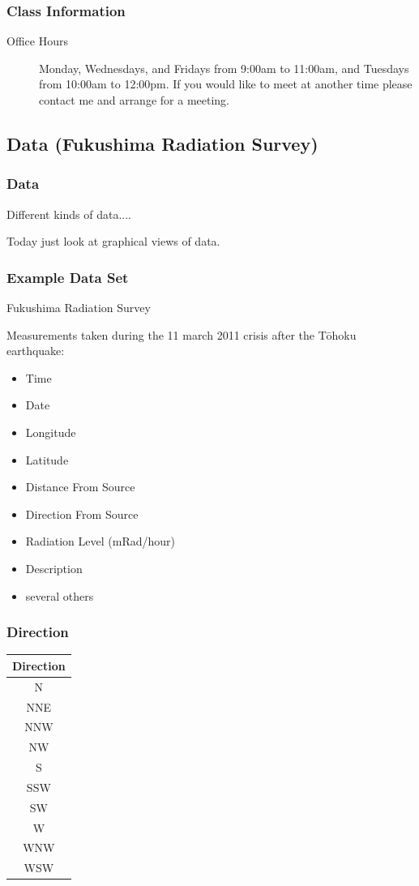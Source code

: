 \begin{frame}
  \frametitle{Class Information}

\begin{description}
  \item[Office Hours] Monday, Wednesdays, and Fridays from 9:00am to
    11:00am, and Tuesdays from 10:00am to 12:00pm.  If you would like
    to meet at another time please contact me and arrange for a
    meeting.

\end{description}


\end{frame}

\subsection{Data (Fukushima Radiation Survey)}

\begin{frame}
  \frametitle{Data}

  Different kinds of data....

  Today just look at graphical views of data.

\end{frame}

\begin{frame}
  \frametitle{Example Data Set}

  Fukushima Radiation Survey

  Measurements taken during the 11 march 2011 crisis after the
  T\={o}hoku earthquake:
  \begin{itemize}
  \item Time
  \item Date
  \item Longitude
  \item Latitude
  \item Distance From Source
  \item Direction From Source
  \item Radiation Level (mRad/hour)
  \item Description
  \item several others
  \end{itemize}

\end{frame}



\begin{frame}
  \frametitle{Direction}

  \begin{tabular}{c}
    Direction \\ \hline 
    N   \\
    NNE  \\
    NNW  \\
    NW  \\
    S  \\
    SSW \\
    SW  \\
    W  \\
    WNW  \\
    WSW 
  \end{tabular}

\end{frame}

